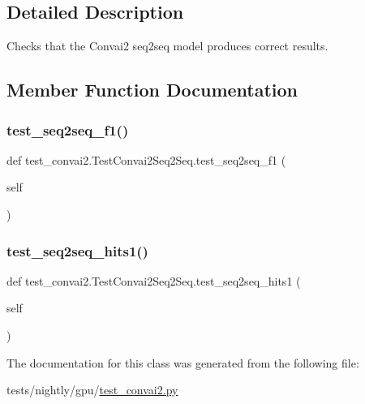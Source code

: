 \subsection{Detailed Description}
\begin{DoxyVerb}Checks that the Convai2 seq2seq model produces correct results.
\end{DoxyVerb}
 

\subsection{Member Function Documentation}
\mbox{\label{classtest__convai2_1_1TestConvai2Seq2Seq_af92bc095f0d62a64388b736f06b003a6}} 
\subsubsection{\texorpdfstring{test\+\_\+seq2seq\+\_\+f1()}{test\_seq2seq\_f1()}}
{\footnotesize\ttfamily def test\+\_\+convai2.\+Test\+Convai2\+Seq2\+Seq.\+test\+\_\+seq2seq\+\_\+f1 (\begin{DoxyParamCaption}\item[{}]{self }\end{DoxyParamCaption})}

\mbox{\label{classtest__convai2_1_1TestConvai2Seq2Seq_ae1f1ed9b54523ecf62a983e6d0ae1bb2}} 
\subsubsection{\texorpdfstring{test\+\_\+seq2seq\+\_\+hits1()}{test\_seq2seq\_hits1()}}
{\footnotesize\ttfamily def test\+\_\+convai2.\+Test\+Convai2\+Seq2\+Seq.\+test\+\_\+seq2seq\+\_\+hits1 (\begin{DoxyParamCaption}\item[{}]{self }\end{DoxyParamCaption})}



The documentation for this class was generated from the following file\+:\begin{DoxyCompactItemize}
\item 
tests/nightly/gpu/\hyperlink{test__convai2_8py}{test\+\_\+convai2.\+py}\end{DoxyCompactItemize}
